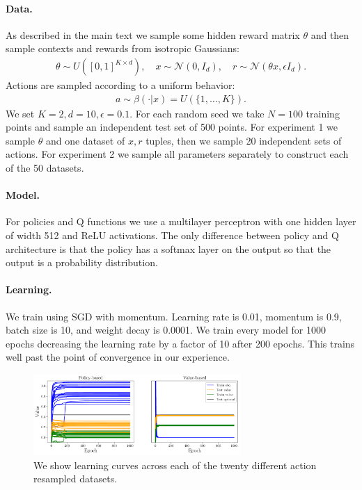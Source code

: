 \paragraph{Data.} As described in the main text we sample some hidden reward matrix $ \theta$ and then sample contexts and rewards from isotropic Gaussians:
\begin{align*}
    \theta \sim U([0,1]^{K\times d}),\quad x \sim \mathcal{N}(0, I_d), \quad r \sim \mathcal{N}(\theta x, \epsilon I_d).
\end{align*}
Actions are sampled according to a uniform behavior:
\begin{align*}
    a\sim \beta(\cdot|x) = U(\{1,\dots,K\}).
\end{align*}
We set $ K=2, d = 10, \epsilon = 0.1$. For each random seed we take $ N = 100$ training points and sample an independent test set of 500 points.
For experiment 1 we sample $ \theta$ and one dataset of $ x,r$ tuples, then we sample 20 independent sets of actions. For experiment 2 we sample all parameters separately to construct each of the 50 datasets.

\paragraph{Model.} For policies and Q functions we use a multilayer perceptron with one hidden layer of width 512 and ReLU activations. The only difference between policy and Q architecture is that the policy has a softmax layer on the output so that the output is a probability distribution.

\paragraph{Learning.} We train using SGD with momentum. Learning rate is 0.01, momentum is 0.9, batch size is 10, and weight decay is 0.0001. We train every model for 1000 epochs decreasing the learning rate by a factor of 10 after 200 epochs. This trains well past the point of convergence in our experience.

\begin{figure}[h]
    \centering
    \includegraphics[width=0.7\textwidth]{figures/offline-bandits/toy_learning.pdf}
    \caption{We show learning curves across each of the twenty different action resampled datasets.}
    \label{fig:toy_learning}
\end{figure}

